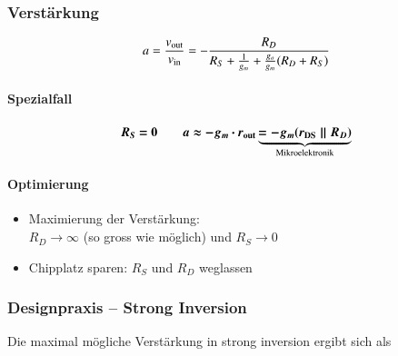 \begin{minipage}[t]{0.58\columnwidth}
    \subsubsection{Verstärkung}

    \vspace{-0.2cm}
    \[
        a = \frac{v_{\rm out}}{v_{\rm in}} = - \frac{R_D}{R_S + \frac{1}{g_m} + \frac{g_o}{g_m}(R_D + R_S)} 
    \]


    \paragraph{Spezialfall}

    \vspace{-0.5cm}

    \[
        \boldsymbol{ R_S = 0 \qquad  a \approx - g_m \cdot r_{\rm out} \underbrace{= - g_m (r_{\rm DS} \parallel R_D) }_{\text{Mikroelektronik}} }
    \]
    


    \vspace{-0.2cm}

    \paragraph{Optimierung}

    \begin{itemize}
        \item Maximierung der Verstärkung: \\
            $R_D \to \infty$ (so gross wie möglich) und $R_S \to 0$
        \item Chipplatz sparen: $R_S$ und $R_D$ weglassen
    \end{itemize}
\end{minipage}


\subsubsection{Designpraxis -- Strong Inversion}

Die \textbf{} maximal mögliche Verstärkung in strong inversion ergibt sich als

\vspace{-0.2cm}


